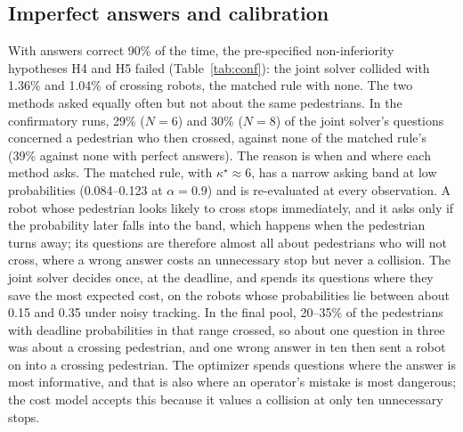 \documentclass[a4paper,fleqn]{cas-dc}
\begin{document}
\subsection{Imperfect answers and calibration}
\label{sec:res-calib}

With answers correct 90\% of the time, the pre-specified non-inferiority hypotheses H4 and H5 failed (Table~\ref{tab:conf}): the joint solver collided with 1.36\% and 1.04\% of crossing robots, the matched rule with none. The two methods asked equally often but not about the same pedestrians. In the confirmatory runs, 29\% ($N = 6$) and 30\% ($N = 8$) of the joint solver's questions concerned a pedestrian who then crossed, against none of the matched rule's (39\% against none with perfect answers). The reason is when and where each method asks. The matched rule, with $\kappa^\star \approx 6$, has a narrow asking band at low probabilities (0.084--0.123 at $\alpha = 0.9$) and is re-evaluated at every observation. A robot whose pedestrian looks likely to cross stops immediately, and it asks only if the probability later falls into the band, which happens when the pedestrian turns away; its questions are therefore almost all about pedestrians who will not cross, where a wrong answer costs an unnecessary stop but never a collision. The joint solver decides once, at the deadline, and spends its questions where they save the most expected cost, on the robots whose probabilities lie between about 0.15 and 0.35 under noisy tracking. In the final pool, 20--35\% of the pedestrians with deadline probabilities in that range crossed, so about one question in three was about a crossing pedestrian, and one wrong answer in ten then sent a robot on into a crossing pedestrian. The optimizer spends questions where the answer is most informative, and that is also where an operator's mistake is most dangerous; the cost model accepts this because it values a collision at only ten unnecessary stops.
\end{document}
